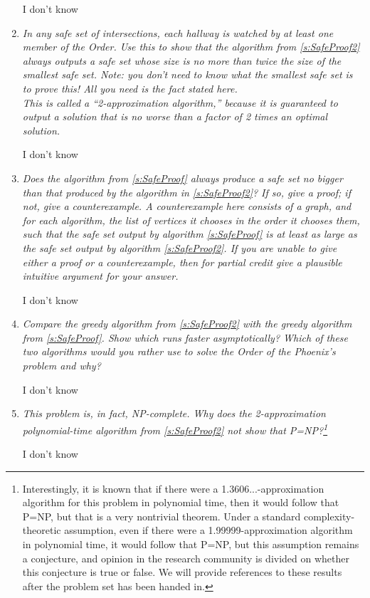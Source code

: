 \documentclass[12pt]{article} \setlength{\oddsidemargin}{0in}
\begin{document}
\begin{enumerate}
I don't know 

\item\textit{In any safe set of intersections, each hallway is watched by at least one member of the Order. Use this to show that the algorithm from \ref{s:SafeProof2} always outputs a safe set whose size is no more than twice the size of the smallest safe set. Note: you don't need to know what the smallest safe set is to prove this! All you need is the fact stated here.\\
This is called a ``2-approximation algorithm,'' because it is guaranteed to output a solution that is no worse than a factor of 2 times an optimal solution.}

I don't know 

\item\textit{Does the algorithm from \ref{s:SafeProof} always produce a safe set no bigger than that produced by the algorithm in \ref{s:SafeProof2}? If so, give a proof; if not, give a counterexample. A counterexample here consists of a graph, and for each algorithm, the list of vertices it chooses in the order it chooses them, such that the safe set output by algorithm \ref{s:SafeProof} is at least as large as the safe set output by algorithm \ref{s:SafeProof2}. If you are unable to give either a proof or a counterexample, then for partial credit give a plausible intuitive argument for your answer.}

I don't know 

\item\textit{Compare the greedy algorithm from \ref{s:SafeProof2} with the greedy algorithm from \ref{s:SafeProof}. Show which runs faster asymptotically? Which of these two algorithms would you rather use to solve the Order of the Phoenix's problem and why?}

I don't know 

\item\textit{This problem is, in fact, NP-complete. Why does the 2-approximation polynomial-time algorithm from \ref{s:SafeProof2} not show that P=NP?\footnote{Interestingly, it is known that if there were a 1.3606...-approximation algorithm for this problem in polynomial time, then it would follow that P=NP, but that is a very nontrivial theorem. Under a standard complexity-theoretic assumption, even if there were a 1.99999-approximation algorithm in polynomial time, it would follow that P=NP, but this assumption remains a conjecture, and opinion in the research community is divided on whether this conjecture is true or false. We will provide references to these results after the problem set has been handed in.}}

I don't know 

\end{enumerate}
\end{document}

